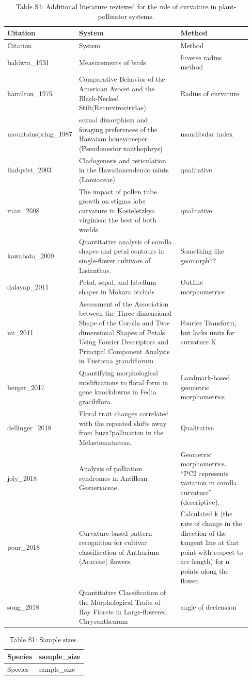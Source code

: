 \documentclass[]{article}
\begin{document}
\begin{longtable}[]{@{}lll@{}}
\caption{Table S1: Additional literature reviewed for the role of
curvature in plant-pollinator systems.}\tabularnewline
\toprule
Citation & System & Method\tabularnewline
\midrule
\endfirsthead
\toprule
Citation & System & Method\tabularnewline
\midrule
\endhead
baldwin\_1931 & Measurements of birds & Inverse radius
method\tabularnewline
hamilton\_1975 & Comparative Behavior of the American Avocet and the
Black-Necked Stilt(Recurvirostridae) & Radius of
curvature\tabularnewline
mountainspring\_1987 & sexual dimorphism and foraging preferences of the
Hawaiian honeycreeper (Pseudonestor xanthophrys) & mandibular
index\tabularnewline
lindqvist\_2003 & Cladogenesis and reticulation in the Hawaiianendemic
mints (Lamiaceae) & qualitative\tabularnewline
ruan\_2008 & The impact of pollen tube growth on stigma lobe curvature
in Kosteletzkya virginica: the best of both worlds &
qualitative\tabularnewline
kawabata\_2009 & Quantitative analysis of corolla shapes and petal
contours in single-flower cultivars of Lisianthus. & Something like
geomorph??\tabularnewline
dalayap\_2011 & Petal, sepal, and labellum shapes in Mokara orchids &
Outline morphometrics\tabularnewline
nii\_2011 & Assessment of the Association between the Three-dimensional
Shape of the Corolla and Two-dimensional Shapes of Petals Using Fourier
Descriptors and Principal Component Analysis in Eustoma grandiflorum &
Fourier Transform, but lacks units for curvature K\tabularnewline
berger\_2017 & Quantifying morphological modifications to floral form in
gene knockdowns in Fedia graciliflora. & Landmark-based geometric
morphometrics\tabularnewline
dellinger\_2018 & Floral trait changes correlated with the repeated
shifts away from buzz?pollination in the Melastomataceae. &
Qualitative\tabularnewline
joly\_2018 & Analysis of polliation syndromes in Antillean Gesneriaceae.
& Geometric morphometrics. ``PC2 represents variation in corolla
curvature'' (descriptive).\tabularnewline
pour\_2018 & Curvature-based pattern recognition for cultivar
classification of Anthurium (Araceae) flowers. & Calculated k (the rate
of change in the direction of the tangent line at that point with
respect to arc length) for n points along the flower.\tabularnewline
song\_2018 & Quantitative Classification of the Morphological Traits of
Ray Florets in Large-flowered Chrysanthemum & angle of
declension\tabularnewline
\bottomrule
\end{longtable}

\begin{longtable}[]{@{}ll@{}}
\caption{Table S1: Sample sizes.}\tabularnewline
\toprule
Species & sample\_size\tabularnewline
\midrule
\endfirsthead
\toprule
Species & sample\_size\tabularnewline
\midrule
\endhead
\bottomrule
\end{longtable}
\end{document}
